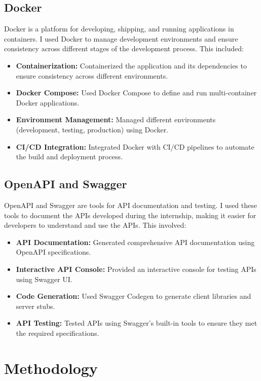 \documentclass[openany, 11pt]{report} %
\begin{document}
\section{Docker}
Docker is a platform for developing, shipping, and running applications in containers. I used Docker to manage development environments and ensure consistency across different stages of the development process. This included:
\begin{itemize}
    \item \textbf{Containerization:} Containerized the application and its dependencies to ensure consistency across different environments.
    \item \textbf{Docker Compose:} Used Docker Compose to define and run multi-container Docker applications.
    \item \textbf{Environment Management:} Managed different environments (development, testing, production) using Docker.
    \item \textbf{CI/CD Integration:} Integrated Docker with CI/CD pipelines to automate the build and deployment process.
\end{itemize}

\section{OpenAPI and Swagger}
OpenAPI and Swagger are tools for API documentation and testing. I used these tools to document the APIs developed during the internship, making it easier for developers to understand and use the APIs. This involved:
\begin{itemize}
    \item \textbf{API Documentation:} Generated comprehensive API documentation using OpenAPI specifications.
    \item \textbf{Interactive API Console:} Provided an interactive console for testing APIs using Swagger UI.
    \item \textbf{Code Generation:} Used Swagger Codegen to generate client libraries and server stubs.
    \item \textbf{API Testing:} Tested APIs using Swagger's built-in tools to ensure they met the required specifications.
\end{itemize}

\chapter{Methodology}
\end{document}
